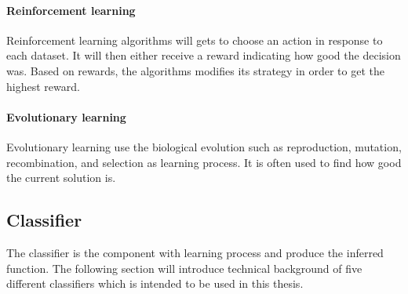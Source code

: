 \documentclass[USenglish]{ifimaster}  %
\begin{document}
\paragraph{Reinforcement learning}
Reinforcement learning algorithms will gets to choose an action in response to each dataset. It will then either receive a reward indicating how good the decision was. Based on rewards, the algorithms modifies its strategy in order to get the highest reward.

\paragraph{Evolutionary learning}
Evolutionary learning use the biological evolution such as reproduction, mutation, recombination, and selection as learning process. It is often used to find how good the current solution is.

\subsection{Classifier}
The classifier is the component with learning process and produce the inferred function. The following section will introduce technical background of five different classifiers which is intended to be used in this thesis.
\end{document}
